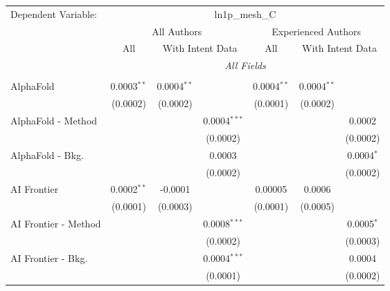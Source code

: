 \begingroup
\centering
\begin{tabular}{lcccccc}
   \tabularnewline \midrule \midrule
   Dependent Variable: & \multicolumn{6}{c}{ln1p\_mesh\_C}\\
 & \multicolumn{3}{c}{All Authors} & \multicolumn{3}{c}{Experienced Authors} \\
\cmidrule(lr){2-4} \cmidrule(lr){5-7}
 & \multicolumn{1}{c}{All} & \multicolumn{2}{c}{With Intent Data} & \multicolumn{1}{c}{All} & \multicolumn{2}{c}{With Intent Data} \\
\cmidrule(lr){2-2} \cmidrule(lr){3-4} \cmidrule(lr){5-5} \cmidrule(lr){6-7}
 & \multicolumn{6}{c}{\textit{All Fields}} \\ \\
   AlphaFold            & 0.0003$^{**}$ & 0.0004$^{**}$ &                 & 0.0004$^{**}$ & 0.0004$^{**}$ &   \\   
                        & (0.0002)      & (0.0002)      &                 & (0.0001)      & (0.0002)      &   \\   
   AlphaFold - Method   &               &               & 0.0004$^{***}$  &               &               & 0.0002\\   
                        &               &               & (0.0002)        &               &               & (0.0002)\\   
   AlphaFold - Bkg.     &               &               & 0.0003          &               &               & 0.0004$^{*}$\\   
                        &               &               & (0.0002)        &               &               & (0.0002)\\   
   AI Frontier          & 0.0002$^{**}$ & -0.0001       &                 & 0.00005       & 0.0006        &   \\   
                        & (0.0001)      & (0.0003)      &                 & (0.0001)      & (0.0005)      &   \\   
   AI Frontier - Method &               &               & 0.0008$^{***}$  &               &               & 0.0005$^{*}$\\   
                        &               &               & (0.0002)        &               &               & (0.0003)\\   
   AI Frontier - Bkg.   &               &               & 0.0004$^{***}$  &               &               & 0.0004\\   
                        &               &               & (0.0001)        &               &               & (0.0002)\\   

\end{tabular}
